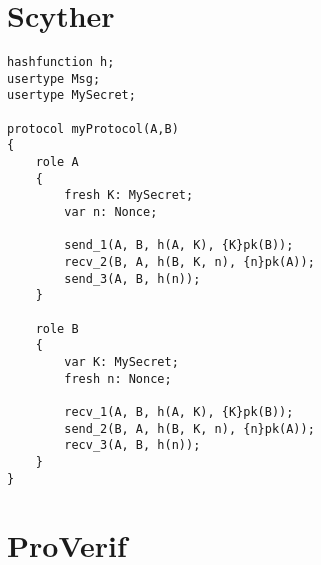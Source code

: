 \documentclass[10pt,a4paper]{article}
\begin{document}






\newpage

\section{Scyther}

\begin{Verbatim}[fontsize=\scriptsize]
hashfunction h;
usertype Msg;
usertype MySecret;

protocol myProtocol(A,B)
{
	role A
	{
		fresh K: MySecret;
		var n: Nonce;

		send_1(A, B, h(A, K), {K}pk(B));
		recv_2(B, A, h(B, K, n), {n}pk(A));
		send_3(A, B, h(n));
	}	
	
	role B
	{
		var K: MySecret;
		fresh n: Nonce;

		recv_1(A, B, h(A, K), {K}pk(B));
		send_2(B, A, h(B, K, n), {n}pk(A));
		recv_3(A, B, h(n));
	}
}
\end{Verbatim}



\section{ProVerif}
\end{document}
